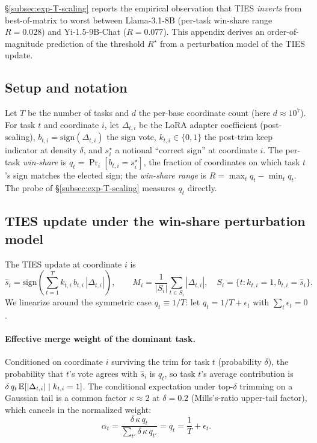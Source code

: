 \S\ref{subsec:exp-T-scaling} reports the empirical observation that
TIES \emph{inverts} from best-of-matrix to worst between
Llama-3.1-8B (per-task win-share range $R = 0.028$) and Yi-1.5-9B-Chat
($R = 0.077$). This appendix derives an order-of-magnitude prediction
of the threshold $R^\star$ from a perturbation model of the TIES
update.

\subsection{Setup and notation}
\label{app:td2-setup}

Let $T$ be the number of tasks and $d$ the per-base coordinate count
(here $d \approx 10^7$). For task $t$ and coordinate $i$, let
$\Delta_{t,i}$ be the LoRA adapter coefficient (post-scaling),
$b_{t,i} = \mathrm{sign}(\Delta_{t,i})$ the sign vote, $k_{t,i} \in
\{0,1\}$ the post-trim keep indicator at density $\delta$, and
$s_i^\star$ a notional ``correct sign'' at coordinate $i$. The
per-task \emph{win-share} is $q_t = \Pr_i[b_{t,i} = s_i^\star]$, the
fraction of coordinates on which task $t$'s sign matches the elected
sign; the \emph{win-share range} is $R = \max_t q_t - \min_t q_t$. The
probe of \S\ref{subsec:exp-T-scaling} measures $q_t$ directly.

\subsection{TIES update under the win-share perturbation model}

The TIES update at coordinate $i$ is
\begin{equation}
  \hat{s}_i
  =
  \mathrm{sign}\!\left(
    \sum_{t=1}^{T} k_{t,i}\, b_{t,i}\, |\Delta_{t,i}|
  \right),
  \qquad
  M_i
  =
  \frac{1}{|S_i|} \sum_{t \in S_i}\!|\Delta_{t,i}|,
  \quad
  S_i = \{t : k_{t,i} = 1, b_{t,i} = \hat{s}_i\}.
  \label{eq:ties-update}
\end{equation}
We linearize around the symmetric case $q_t \equiv 1/T$: let
$q_t = 1/T + \epsilon_t$ with $\sum_t \epsilon_t = 0$.

\paragraph{Effective merge weight of the dominant task.} Conditioned
on coordinate $i$ surviving the trim for task $t$ (probability
$\delta$), the probability that $t$'s vote agrees with $\hat{s}_i$ is
$q_t$, so task $t$'s average contribution is $\delta\, q_t\,
\mathbb{E}[|\Delta_{t,i}| \mid k_{t,i} = 1]$. The conditional expectation under
top-$\delta$ trimming on a Gaussian tail is a common factor
$\kappa \approx 2$ at $\delta = 0.2$ (Mills's-ratio upper-tail
factor), which cancels in the normalized weight:
\begin{equation}
  \alpha_t
  =
  \frac{\delta\,\kappa\,q_t}{\sum_{t'} \delta\,\kappa\,q_{t'}}
  = q_t = \frac{1}{T} + \epsilon_t.
  \label{eq:alpha-weight}
\end{equation}

